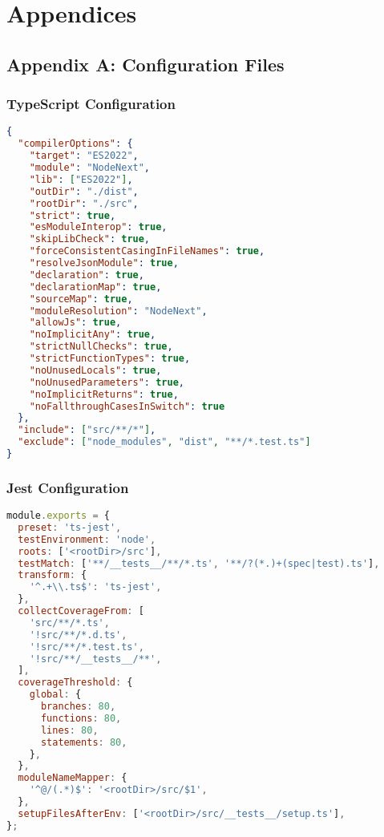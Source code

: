 \documentclass[12pt,a4paper]{report}
\begin{document}
\chapter{Appendices}

\section{Appendix A: Configuration Files}

\subsection{TypeScript Configuration}

\begin{lstlisting}[language=JSON, caption=tsconfig.json]
{
  "compilerOptions": {
    "target": "ES2022",
    "module": "NodeNext",
    "lib": ["ES2022"],
    "outDir": "./dist",
    "rootDir": "./src",
    "strict": true,
    "esModuleInterop": true,
    "skipLibCheck": true,
    "forceConsistentCasingInFileNames": true,
    "resolveJsonModule": true,
    "declaration": true,
    "declarationMap": true,
    "sourceMap": true,
    "moduleResolution": "NodeNext",
    "allowJs": true,
    "noImplicitAny": true,
    "strictNullChecks": true,
    "strictFunctionTypes": true,
    "noUnusedLocals": true,
    "noUnusedParameters": true,
    "noImplicitReturns": true,
    "noFallthroughCasesInSwitch": true
  },
  "include": ["src/**/*"],
  "exclude": ["node_modules", "dist", "**/*.test.ts"]
}
\end{lstlisting}

\subsection{Jest Configuration}

\begin{lstlisting}[language=JavaScript, caption=jest.config.js]
module.exports = {
  preset: 'ts-jest',
  testEnvironment: 'node',
  roots: ['<rootDir>/src'],
  testMatch: ['**/__tests__/**/*.ts', '**/?(*.)+(spec|test).ts'],
  transform: {
    '^.+\\.ts$': 'ts-jest',
  },
  collectCoverageFrom: [
    'src/**/*.ts',
    '!src/**/*.d.ts',
    '!src/**/*.test.ts',
    '!src/**/__tests__/**',
  ],
  coverageThreshold: {
    global: {
      branches: 80,
      functions: 80,
      lines: 80,
      statements: 80,
    },
  },
  moduleNameMapper: {
    '^@/(.*)$': '<rootDir>/src/$1',
  },
  setupFilesAfterEnv: ['<rootDir>/src/__tests__/setup.ts'],
};
\end{lstlisting}
\end{document}
